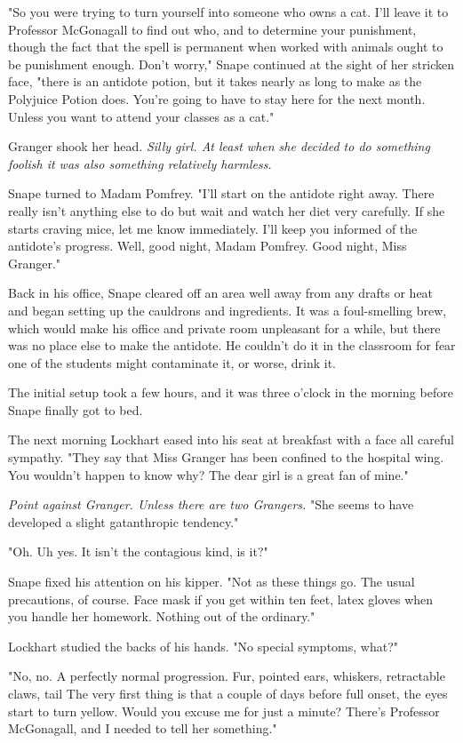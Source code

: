 "So you were trying to turn yourself into someone who owns a cat. I'll leave it to Professor McGonagall to find out who, and to determine your punishment, though the fact that the spell is permanent when worked with animals ought to be punishment enough. Don't worry," Snape continued at the sight of her stricken face, "there is an antidote potion, but it takes nearly as long to make as the Polyjuice Potion does. You're going to have to stay here for the next month. Unless you want to attend your classes as a cat."

Granger shook her head. \emph{Silly girl. At least when she decided to do something foolish it was also something relatively harmless.}

Snape turned to Madam Pomfrey. "I'll start on the antidote right away. There really isn't anything else to do but wait and watch her diet very carefully. If she starts craving mice, let me know immediately. I'll keep you informed of the antidote's progress. Well, good night, Madam Pomfrey. Good night, Miss Granger."

Back in his office, Snape cleared off an area well away from any drafts or heat and began setting up the cauldrons and ingredients. It was a foul-smelling brew, which would make his office and private room unpleasant for a while, but there was no place else to make the antidote. He couldn't do it in the classroom for fear one of the students might contaminate it, or worse, drink it.

The initial setup took a few hours, and it was three o'clock in the morning before Snape finally got to bed.

The next morning Lockhart eased into his seat at breakfast with a face all careful sympathy. "They say that Miss Granger has been confined to the hospital wing. You wouldn't happen to know why? The dear girl is a great fan of mine."

\emph{Point against Granger. Unless there are two Grangers.} "She seems to have developed a slight gatanthropic tendency."

"Oh. Uh{\el} yes. It isn't the contagious kind, is it?"

Snape fixed his attention on his kipper. "Not as these things go. The usual precautions, of course. Face mask if you get within ten feet, latex gloves when you handle her homework. Nothing out of the ordinary."

Lockhart studied the backs of his hands. "No special symptoms, what?"

"No, no. A perfectly normal progression. Fur, pointed ears, whiskers, retractable claws, tail{\el} The very first thing is that a couple of days before full onset, the eyes start to turn yellow. Would you excuse me for just a minute? There's Professor McGonagall, and I needed to tell her something."

